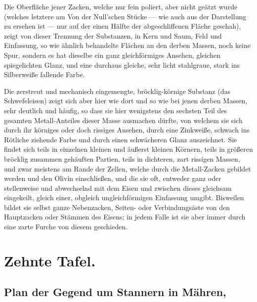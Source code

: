 \documentclass[a4paper, 11pt, oneside, german]{article}
\begin{document}
Die Oberfläche jener Zacken, welche nur fein poliert, aber nicht geätzt wurde (welches letztere am Von der Null'schen Stücke --- wie auch aus der Darstellung zu ersehen ist --- nur auf der einen Hälfte der abgeschliffenen Fläche geschah), zeigt von dieser Trennung der Substanzen, in Kern und Saum, Feld und Einfassung, so wie ähnlich behandelte Flächen an den derben Massen, noch keine Spur, sondern es hat dieselbe ein ganz gleichförmiges Ansehen, gleichen spiegelichten Glanz, und eine durchaus gleiche, sehr licht stahlgraue, stark ins Silberweiße fallende Farbe.

Die zerstreut und mechanisch eingemengte, bröcklig-körnige Substanz (das Schwefeleisen) zeigt sich aber hier wie dort und so wie bei jenen derben Massen, sehr deutlich und häufig, so dass sie hier wenigstens den sechsten Teil des gesamten Metall-Anteiles dieser Masse ausmachen dürfte, von welchem sie sich durch ihr körniges oder doch rissiges Ansehen, durch eine Zinkweiße, schwach ins Rötliche ziehende Farbe und durch einen schwächeren Glanz auszeichnet. Sie findet sich teils in einzelnen kleinen und äußerst kleinen Körnern, teils in größeren bröcklig zusammen gehäuften Partien, teils in dichteren, zart rissigen Massen, und zwar meistens am Rande der Zellen, welche durch die Metall-Zacken gebildet werden und den Olivin einschließen, und die sie oft, entweder ganz oder stellenweise und abwechselnd mit dem Eisen und zwischen dieses gleichsam eingekeilt, gleich einer, obgleich ungleichförmigen Einfassung umgibt. Bisweilen bildet sie selbst ganze Nebenzacken, Seiten- oder Verbindungsäste von den Hauptzacken oder Stämmen des Eisens; in jedem Falle ist sie aber immer durch eine zarte Furche von diesem geschieden.
\clearpage
\section{Zehnte Tafel.}
\subsection[Plan der Gegend um Stannern in Mähren.]{Plan der Gegend um Stannern in Mähren,}
\end{document}
